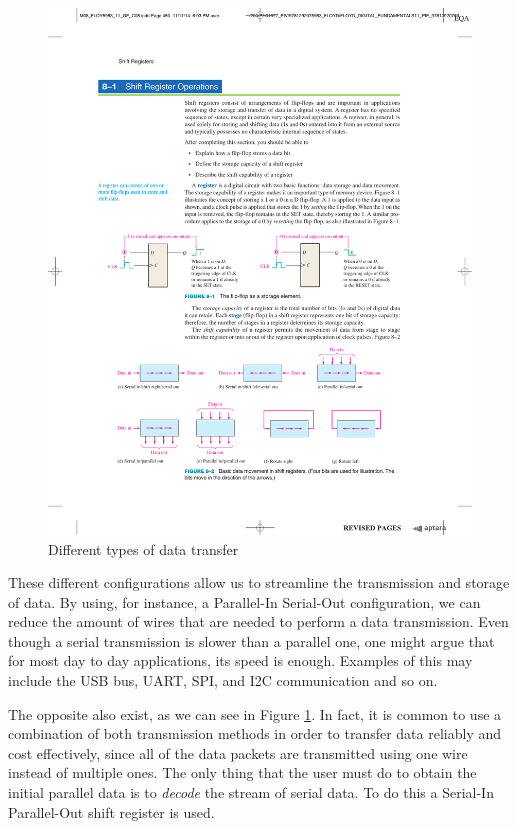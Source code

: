 \begin{figure}[H]
    \centering
    \includegraphics[scale = 0.85]{Graphics/Practice 5/SHIFT_REGISTER_BASICS/DATA_TRANSMISSION/Data_Movement_451.pdf}
    \caption{Different types of data transfer ~\autocite{FLOYD}}
    \label{fig:DATA_TRANSFER}
\end{figure}

These different configurations allow us to streamline the transmission and storage of data. By using, for instance, a Parallel-In Serial-Out configuration, we can reduce the amount of wires that are needed to perform a data transmission. Even though a serial transmission is slower than a parallel one, one might argue that for most day to day applications, its speed is enough. Examples of this may include the USB bus, UART, SPI, and I2C communication and so on.\medskip

The opposite also exist, as we can see in Figure \ref{fig:DATA_TRANSFER}. In fact, it is common to use a combination of both transmission methods in order to transfer data reliably and cost effectively, since all of the data packets are transmitted using one wire instead of multiple ones. The only thing that the user must do to obtain the initial parallel data is to \textit{decode} the stream of serial data. To do this a Serial-In Parallel-Out shift register is used. \medskip

